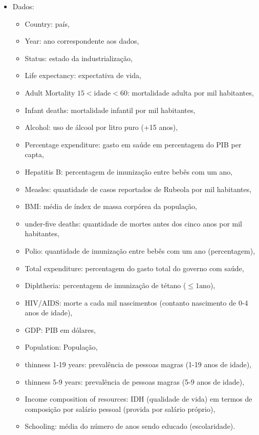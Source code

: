 \documentclass[12pt]{article}
\begin{document}
\begin{itemize}
\item Dados:
\begin{itemize}
\item Country: país,
\item Year: ano correspondente aos dados,
\item Status: estado da industrialização,
\item Life expectancy: expectativa de vida,
\item Adult Mortality \(15<\text{idade}<60\): mortalidade adulta por mil habitantes,
\item Infant deaths: mortalidade infantil por mil habitantes,
\item Alcohol: uso de álcool por litro puro (+15 anos),
\item Percentage expenditure: gasto em saúde em percentagem do PIB per capta,
\item Hepatitis B: percentagem de imunização entre bebês com um ano,
\item Measles: quantidade de casos reportados de Rubeola por mil habitantes,
\item BMI: média de índex de massa corpórea da população,
\item under-five deaths: quantidade de mortes antes dos cinco anos por mil habitantes,
\item Polio: quantidade de imunização entre bebês com um ano (percentagem),
\item Total expenditure: percentagem do gasto total do governo com saúde,
\item Diphtheria: percentagem de imunização de tétano (\(\leq 1 \text{ano}\)),
\item HIV/AIDS: morte a cada mil nascimentos (contanto nascimento de 0-4 anos de idade),
\item GDP: PIB em dólares,
\item Population: População,
\item thinness  1-19 years: prevalência de pessoas magras (1-19 anos de idade),
\item thinness 5-9 years: prevalência de pessoas magras (5-9 anos de idade),
\item Income composition of resources: IDH (qualidade de vida) em termos de composição por salário pessoal (provida por salário próprio),
\item Schooling: média do número de anos sendo educado (escolaridade).
\end{itemize}
\end{itemize}
\end{document}
